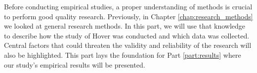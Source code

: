 Before conducting empirical studies, a proper understanding of methods is crucial to perform good quality research. Previously, in Chapter \ref{chap:research_methods} we looked at general research methods. In this part, we will use that knowledge to describe how the study of Hover was conducted and which data was collected. Central factors that could threaten the validity and reliability of the research will also be highlighted. This part lays the foundation for Part \ref{part:results} where our study’s empirical results will be presented.
\clearpage


\clearpage


\clearpage


\clearpage